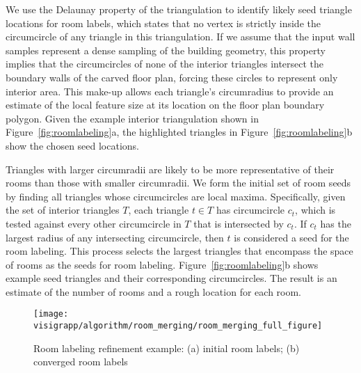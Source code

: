 \documentclass[12pt,onecolumn,oneside]{book}
\begin{document}

We use the Delaunay property of the triangulation to identify likely seed triangle locations for room labels, which states that no vertex is strictly inside the circumcircle of any triangle in this triangulation.  If we assume that the input wall samples represent a dense sampling of the building geometry, this property implies that the circumcircles of none of the interior triangles intersect the boundary walls of the carved floor plan, forcing these circles to represent only interior area.  This make-up allows each triangle's circumradius to provide an estimate of the local feature size at its location on the floor plan boundary polygon.  Given the example interior triangulation shown in Figure~\ref{fig:roomlabeling}a, the highlighted triangles in Figure~\ref{fig:roomlabeling}b show the chosen seed locations.

Triangles with larger circumradii are likely to be more representative of their rooms than those with smaller circumradii.  We form the initial set of room seeds by finding all triangles whose circumcircles are local maxima.  Specifically, given the set of interior triangles $T$, each triangle $t \in T$ has circumcircle $c_t$, which is tested against every other circumcircle in $T$ that is intersected by $c_t$.  If $c_t$ has the largest radius of any intersecting circumcircle, then $t$ is considered a seed for the room labeling.  This process selects the largest triangles that encompass the space of rooms as the seeds for room labeling.  Figure~\ref{fig:roomlabeling}b shows example seed triangles and their corresponding circumcircles.  The result is an estimate of the number of rooms and a rough location for each room.


\begin{figure}
  \centering
  \texttt{[image: visigrapp/algorithm/room\_merging/room\_merging\_full\_figure]}
  \caption[Room labeling refinement example.]{Room labeling refinement example: (a) initial room labels; (b) converged room labels}
  \label{fig:roommerging}
\end{figure}
\end{document}
